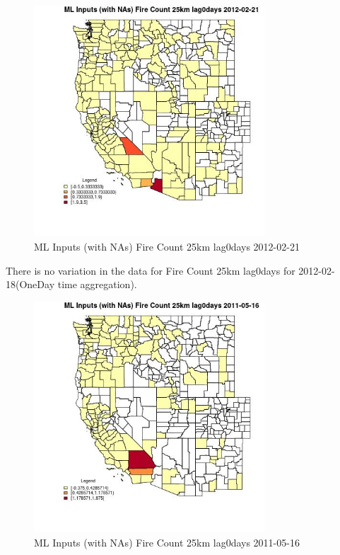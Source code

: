 \begin{figure} 
\centering  
\includegraphics[width=0.77\textwidth]{Code_Outputs/Report_ML_input_PM25_Step4_part_f_de_duplicated_aveswNAs_CountyFire_Count_25km_lag0daysMean2012-02-21.jpg} 
\caption{\label{fig:Report_ML_input_PM25_Step4_part_f_de_duplicated_aveswNAsCountyFire_Count_25km_lag0daysMean2012-02-21}ML Inputs (with NAs) Fire Count 25km lag0days 2012-02-21} 
\end{figure} 
 

There is no variation in the data for Fire Count 25km lag0days for 2012-02-18(OneDay time aggregation). 
 

\begin{figure} 
\centering  
\includegraphics[width=0.77\textwidth]{Code_Outputs/Report_ML_input_PM25_Step4_part_f_de_duplicated_aveswNAs_CountyFire_Count_25km_lag0daysMean2011-05-16.jpg} 
\caption{\label{fig:Report_ML_input_PM25_Step4_part_f_de_duplicated_aveswNAsCountyFire_Count_25km_lag0daysMean2011-05-16}ML Inputs (with NAs) Fire Count 25km lag0days 2011-05-16} 
\end{figure} 
 

